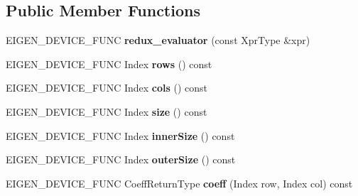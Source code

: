 \subsection*{Public Member Functions}
\begin{DoxyCompactItemize}
\item 
\mbox{\label{class_eigen_1_1internal_1_1redux__evaluator_a487c02f00711feaa4de98d60bfea6dfa}} 
E\+I\+G\+E\+N\+\_\+\+D\+E\+V\+I\+C\+E\+\_\+\+F\+U\+NC {\bfseries redux\+\_\+evaluator} (const Xpr\+Type \&xpr)
\item 
\mbox{\label{class_eigen_1_1internal_1_1redux__evaluator_a2c19ff41ffb50b8f5fa84057565f85ee}} 
E\+I\+G\+E\+N\+\_\+\+D\+E\+V\+I\+C\+E\+\_\+\+F\+U\+NC Index {\bfseries rows} () const
\item 
\mbox{\label{class_eigen_1_1internal_1_1redux__evaluator_a1f04979dab75676a4f227759d20b94bb}} 
E\+I\+G\+E\+N\+\_\+\+D\+E\+V\+I\+C\+E\+\_\+\+F\+U\+NC Index {\bfseries cols} () const
\item 
\mbox{\label{class_eigen_1_1internal_1_1redux__evaluator_a9c66829411f30c3b07b72119381c87d1}} 
E\+I\+G\+E\+N\+\_\+\+D\+E\+V\+I\+C\+E\+\_\+\+F\+U\+NC Index {\bfseries size} () const
\item 
\mbox{\label{class_eigen_1_1internal_1_1redux__evaluator_a52040bcf477aef883f0f7646acfb33cc}} 
E\+I\+G\+E\+N\+\_\+\+D\+E\+V\+I\+C\+E\+\_\+\+F\+U\+NC Index {\bfseries inner\+Size} () const
\item 
\mbox{\label{class_eigen_1_1internal_1_1redux__evaluator_aa0b9d4249bc6eb1cd957e669929721e8}} 
E\+I\+G\+E\+N\+\_\+\+D\+E\+V\+I\+C\+E\+\_\+\+F\+U\+NC Index {\bfseries outer\+Size} () const
\item 
\mbox{\label{class_eigen_1_1internal_1_1redux__evaluator_a55d9a4f6db1a8bce00f218a2fe304f73}} 
E\+I\+G\+E\+N\+\_\+\+D\+E\+V\+I\+C\+E\+\_\+\+F\+U\+NC Coeff\+Return\+Type {\bfseries coeff} (Index row, Index col) const
\item 

\end{DoxyCompactItemize}

